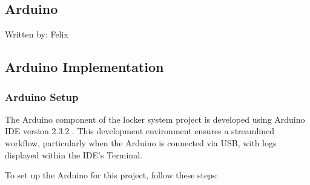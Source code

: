 \subsection{Arduino}
{\tiny Written by: Felix}

\subsection{Arduino Implementation}

\subsubsection{Arduino Setup}

The Arduino component of the locker system project is developed using Arduino IDE version 2.3.2 \cite{arduino-software}. This development environment ensures a streamlined workflow, particularly when the Arduino is connected via USB, with logs displayed within the IDE's Terminal.

To set up the Arduino for this project, follow these steps:


